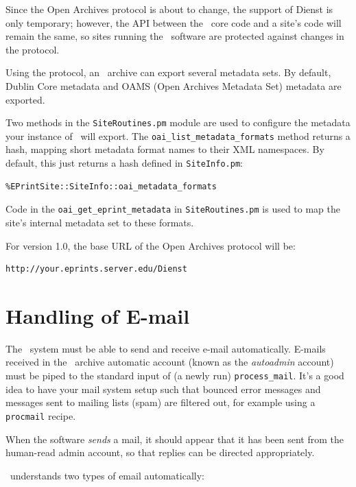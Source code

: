 Since the Open Archives protocol is about to change, the support of Dienst is only temporary; however, the API between the \eprints\ core code and a site's code will remain the same, so sites running the \eprints\ software are protected against changes in the protocol.

Using the protocol, an \eprints\ archive can export several metadata sets. By default, Dublin Core metadata and OAMS (Open Archives Metadata Set) metadata are exported.

Two methods in the {\tt SiteRoutines.pm} module are used to configure the metadata your instance of \eprints\ will export. The {\tt oai\_list\_metadata\_formats} method returns a hash, mapping short metadata format names to their XML namespaces. By default, this just returns a hash defined in {\tt SiteInfo.pm}:

\begin{verbatim}
%EPrintSite::SiteInfo::oai_metadata_formats
\end{verbatim}

Code in the {\tt oai\_get\_eprint\_metadata} in {\tt SiteRoutines.pm} is used to map the site's internal metadata set to these formats.

For version 1.0, the base URL of the Open Archives protocol will be:

\begin{verbatim}
http://your.eprints.server.edu/Dienst
\end{verbatim}


\section{Handling of E-mail}

The \eprints\ system must be able to send and receive e-mail automatically. E-mails received in the \eprints\ archive automatic account (known as the \emph{autoadmin} account) must be piped to the standard input of (a newly run) {\tt process\_mail}. It's a good idea to have your mail system setup such that bounced error messages and messages sent to mailing lists (spam) are filtered out, for example using a {\tt procmail} recipe.

When the software \emph{sends} a mail, it should appear that it has been sent from the human-read admin account, so that replies can be directed appropriately.

\eprints\ understands two types of email automatically:

